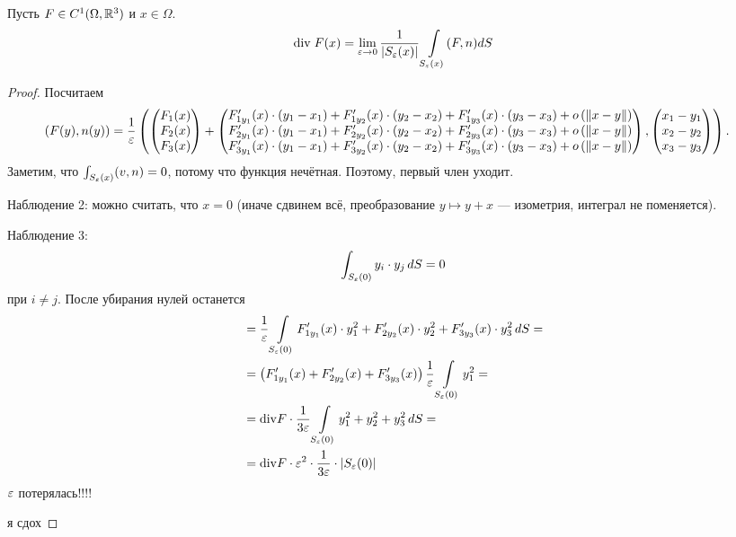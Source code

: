 \begin{thm}
 Пусть $F \in C^{1}(\Omega, \mathbb{R}^{3})$ и $x \in \Omega$.
 \begin{align*}
  \mathrm{div}\;F(x) = \lim_{\varepsilon \to 0} \frac{1}{\left| S_{\varepsilon}(x) \right|} \int\limits_{S_{\varepsilon}(x)} (F,n) dS
 \end{align*} 
\end{thm}
\begin{proof}
 Посчитаем
 \begin{align*}
  (F(y), n(y)) &= \frac{1}{\varepsilon}\left(  \begin{pmatrix}
   F_1(x) \\
   F_2(x) \\
   F_3(x)
  \end{pmatrix} + \begin{pmatrix}
  F'_{1y_1}(x) \cdot \left( y_1-x_1 \right) + F'_{1y_2}(x) \cdot (y_2 -x_2) + F'_{1y_3}(x) \cdot (y_3-x_3) + o \left( \left\| x-y \right\| \right) \\
  F'_{2y_1}(x) \cdot \left( y_1-x_1 \right) + F'_{2y_2}(x) \cdot (y_2 -x_2) + F'_{2y_3}(x) \cdot (y_3-x_3) + o \left( \left\| x-y \right\| \right) \\
  F'_{3y_1}(x) \cdot \left( y_1-x_1 \right) + F'_{3y_2}(x) \cdot (y_2 -x_2) + F'_{3y_3}(x) \cdot (y_3-x_3) + o \left( \left\| x-y \right\| \right) \\
  \end{pmatrix}, \begin{pmatrix}
   x_1 - y_1 \\
   x_2-y_2\\
   x_3-y_3
  \end{pmatrix}\right)
 .\end{align*} Заметим, что $\int_{S_{\varepsilon}(x)} (v, n) = 0  $, потому что функция нечётная. Поэтому, первый член уходит.

 Наблюдение 2: можно считать, что $x = 0$ (иначе сдвинем всё, преобразование $y \mapsto y + x$ --- изометрия, интеграл не поменяется).

 Наблюдение 3:
 \begin{align*}
  \int_{S_{\varepsilon}(0)} y_i \cdot y_j \, dS = 0
 \end{align*} при $i \neq j$. После убирания нулей останется 
 \begin{align*}
  &= \frac{1}{\varepsilon} \int\limits_{S_{\varepsilon}(0)} F'_{1y_1}(x) \cdot y_1^{2} + F'_{2y_2}(x) \cdot y_2^{2} + F'_{3y_3}(x) \cdot y_3^{2} \, dS = \\
  &= \left( F'_{1y_1}(x) + F'_{2y_2}(x) + F'_{3y_3}(x) \right) \frac{1}{\varepsilon} \int\limits_{S_{\varepsilon}(0)} y_1^{2} = \\
  &= \mathrm{div} F \cdot \frac{1}{3\varepsilon} \int\limits_{S_{\varepsilon}(0)} y_1^{2} + y_2^{2} + y_3^{2} \, dS = \\
  &= \mathrm{div} F \cdot \varepsilon^{2} \cdot \frac{1}{3\varepsilon} \cdot \left| S_{\varepsilon}(0) \right|
 \end{align*} $\varepsilon$ потерялась!!!!

 {\color{red} я сдох}
\end{proof}



